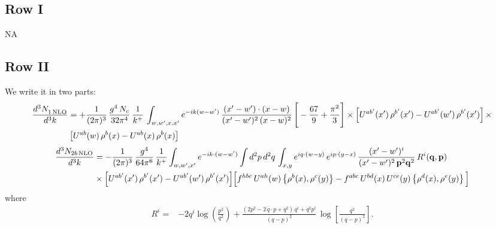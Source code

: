 \documentclass[9pt]{article}
\numberwithin{equation}{section}
\begin{document}
\subsection{Row I}
\textsc{NA}
\subsection{Row II}
We write it in two parts:
\begin{align}
     \frac{d^{3}N_{1\,\rm NLO}^{\rm}}{d^{3}k} &  =  +\frac{1}{(2\pi)^{3}}\, \frac{g^{4}\,N_{c}}{32\pi^{4}}\,\frac{1}{k^{+}}\, \int_{w, w',x,x'} e^{-ik(w-w^\prime)}\, \frac{(x'-w')\cdot (x-w)}{(x'-w')^{2}\, (x-w)^{2}}\, \Bigg[ -\frac{67}{9}+\frac{\pi^{2}}{3}\Bigg]\times \left[U^{ab'}(x')\,\rho^{b'}(x') - U^{ab'}(w')\,\rho^{b'}(x')\right]\times\notag \\ & \left[U^{ab}(w)\,\rho^{b}(x) - U^{ab}(x)\,\rho^{b}(x)\right]
\end{align}
\begin{align}
\frac{d^{3}N_{2b\,\rm NLO}}{d^{3}k} & = -\frac{1}{(2\pi)^{3}}\,\frac{g^{4}}{64\pi^{6}}\,\frac{1}{k^{+}}\int_{w,w',x'} e^{-ik\cdot(w-w')}
\int d^{2}p\,d^{2}q\,\int_{x,y} e^{iq\cdot(w-y)}\,e^{ip\cdot(y-x)}\,\frac{(x'-w')^{i}}{(x'-w')^{2}\,\mathbf{p}^{2}\mathbf{q}^{2}}\,R^{i}(\mathbf{q},\mathbf{p})\notag\\
&\times\Big[U^{ab'}(x')\,\rho^{b'}(x')-U^{ab'}(w')\,\rho^{b'}(x')\Big]
\Big[f^{hbc}\,U^{ah}(w)\left\{\rho^{b}(x),\rho^{c}(y)\right\}-f^{abc}\,U^{bd}(x)\,U^{ce}(y)\left\{\rho^{d}(x),\rho^{e}(y)\right\}\Big]
\end{align}
where
\begin{align}
R^{i} =& -2q^{i}\log\left(\frac{p^{2}}{q^{2}}\right)
+\frac{(2p^{2}-2\,q\cdot p+q^{2})\,q^{i}+q^{2}p^{i}}{(q-p)^{2}}\,
\log\left[\frac{q^{2}}{(q-p)^{2}}\right].
\end{align}
\end{document}
